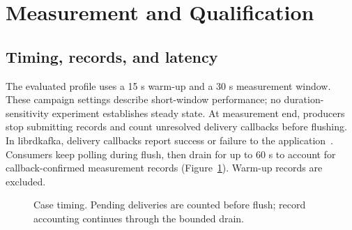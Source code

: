 \documentclass[10pt]{article}
\begin{document}
\section{Measurement and Qualification}
\label{sec:measurement}
\label{sec:qualification}

\subsection{Timing, records, and latency}

The evaluated profile uses a 15 s warm-up and a 30 s measurement window.
These campaign settings describe short-window performance; no duration-sensitivity
experiment establishes steady state.
At measurement end,
producers stop submitting records and count unresolved delivery callbacks before
flushing.  In librdkafka, delivery callbacks report success or failure to the
application~\cite{librdkafkaintroduction}.  Consumers keep polling during flush, then drain for up to 60 s to
account for callback-confirmed measurement records
(Figure~\ref{fig:qualification-workflow}).  Warm-up records are excluded.

\begin{figure}[!htbp]
\centering
{}
\caption{Case timing.  Pending deliveries are counted before flush; record
accounting continues through the bounded drain.}
\label{fig:qualification-workflow}
\end{figure}
\end{document}
